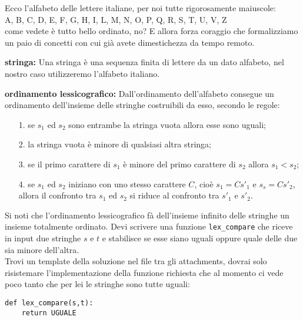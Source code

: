 \renewcommand{\nomebreve}{lex\_compare}
\renewcommand{\titolo}{Confronto lessicografico tra stringhe}

\introduzione{}

Ecco l'alfabeto delle lettere italiane, per noi tutte rigorosamente maiuscole:\\

A, B, C, D, E, F, G, H, I, L, M, N, O, P, Q, R, S, T, U, V, Z\\

\noindent
come vedete è tutto bello ordinato, no?
E allora forza coraggio che formalizziamo un paio di concetti con cui già avete dimestichezza da tempo remoto.

{\bf stringa:} Una stringa è una sequenza finita di lettere da un dato alfabeto, nel nostro caso utilizzeremo l'alfabeto italiano.

{\bf ordinamento lessicografico:} Dall'ordinamento dell'alfabeto consegue un ordinamento dell'insieme delle stringhe costruibili da esso, secondo le regole:
\begin{itemize}
\item[1.] se $s_1$ ed $s_2$ sono entrambe la stringa vuota allora esse sono uguali;
\item[2.] la stringa vuota è minore di qualsiasi altra stringa;
\item[3.] se il primo carattere di $s_1$ è minore del primo carattere di $s_2$ allora $s_1 < s_2$;
\item[4.] se $s_1$ ed $s_2$ iniziano con uno stesso carattere $C$, cioè $s_1 = Cs'_1$ e $s_s = Cs'_2$, allora il confronto tra $s_1$ ed $s_2$ si riduce al confronto tra $s'_1$ e $s'_2$.
\end{itemize}

Si noti che l'ordinamento lessicografico fà dell'insieme infinito delle stringhe un insieme totalmente ordinato. Devi scrivere una funzione {\tt lex\_compare} che riceve in input due stringhe $s$ e $t$ e stabilisce se esse siano uguali oppure quale delle due sia minore dell'altra.\\

Trovi un template della soluzione nel file \textbf{} tra gli attachments, dovrai solo risistemare l'implementazione della funzione richiesta che al momento ci vede poco tanto che per lei le stringhe sono tutte uguali:

\begin{verbatim}
def lex_compare(s,t):
    return UGUALE
\end{verbatim}

